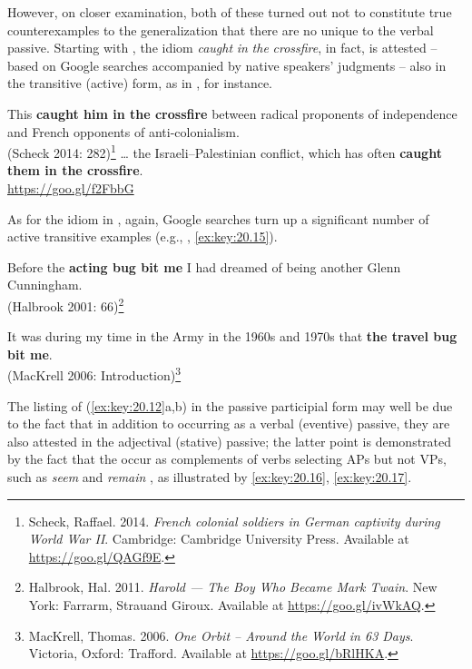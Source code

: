 \documentclass[output=paper]{langsci/langscibook}
\begin{document}
However, on closer examination, both of these turned out not to constitute true
counterexamples to the generalization that there are no  unique to the
verbal passive. Starting with , the idiom \emph{caught}
\emph{in} \emph{the} \emph{crossfire}, in fact, is attested – based on Google
searches accompanied by native speakers’ judgments – also in the transitive
(active) form, as in , for instance.

\ea\label{ex:key:20.13}
    \ea This \textbf{caught him in the crossfire} between radical proponents of
    independence and {French} opponents of anti-colonialism.\\
    \hspace*{\fill}(Scheck 2014: 282)\footnote{Scheck, Raffael. 2014.
    \emph{French colonial soldiers in German captivity during World War II}.
    Cambridge: Cambridge University Press. Available at
    \url{https://goo.gl/QAGf9E}.}
    \ex \dots{} the Israeli--Palestinian conflict, which has often
    \textbf{caught them in the crossfire}.\\
    \hspace*{\fill}\url{https://goo.gl/f2FbbG}
    \z
\z

As for the idiom in , again, Google searches turn up a
significant number of active transitive examples (e.g.,
, \eqref{ex:key:20.15}).

\ea\label{ex:key:20.14}
    Before the \textbf{acting bug bit me} I had dreamed of being another
    Glenn Cunningham.\\\hspace*{\fill}
    (Halbrook 2001: 66)\footnote{Halbrook, Hal. 2011. \emph{Harold ---
    The Boy Who Became Mark Twain}. New York: Farrarm, Strauand Giroux.
    Available at \url{https://goo.gl/ivWkAQ}.}
\z

\ea\label{ex:key:20.15}
    It was during my time in the Army in the 1960s and 1970s that \textbf{the
    travel bug bit me}.\\\hspace*{\fill}
    (MacKrell 2006: Introduction)\footnote{MacKrell, Thomas.  2006.
    \emph{One Orbit -- Around the World in 63 Days}. Victoria, Oxford:
    Trafford.  Available at \url{https://goo.gl/bRlHKA}.}
\z

The listing of (\ref{ex:key:20.12}a,b) in the passive participial form may well
be due to the fact that in addition to occurring as a verbal (eventive)
passive, they are also attested in the adjectival (stative) passive; the latter
point is demonstrated by the fact that the  occur as complements of
verbs selecting APs but not VPs, such as \emph{seem} and \emph{remain}
\citep{Wasow1977}, as illustrated by \eqref{ex:key:20.16},
\eqref{ex:key:20.17}.
\end{document}

